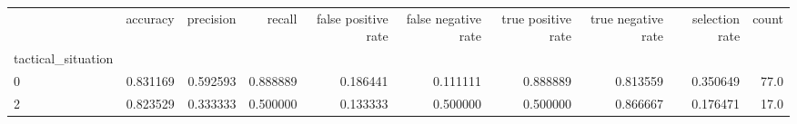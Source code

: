 \begin{tabular}{lrrrrrrrrr}
\toprule
{} &  accuracy &  precision &    recall &  false positive rate &  false negative rate &  true positive rate &  true negative rate &  selection rate &  count \\
tactical\_situation &           &            &           &                      &                      &                     &                     &                 &        \\
\midrule
0                  &  0.831169 &   0.592593 &  0.888889 &             0.186441 &             0.111111 &            0.888889 &            0.813559 &        0.350649 &   77.0 \\
2                  &  0.823529 &   0.333333 &  0.500000 &             0.133333 &             0.500000 &            0.500000 &            0.866667 &        0.176471 &   17.0 \\
\bottomrule
\end{tabular}
